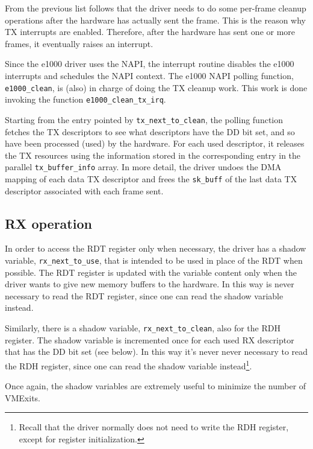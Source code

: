 From the previous list follows that the driver needs to do some per-frame cleanup operations after the hardware has actually sent the
frame. This is the reason why TX interrupts are enabled. Therefore, after the hardware has sent one or more frames, it eventually 
raises an interrupt.

\vspace{0.5cm}

Since the e1000 driver uses the NAPI, the interrupt routine disables the e1000 interrupts and schedules the NAPI context.
The e1000 NAPI polling function, \texttt{e1000\_clean}, is (also) in charge of doing the TX cleanup work. This work is done invoking
the function \texttt{e1000\_clean\_tx\_irq}.

Starting from the entry pointed by \texttt{tx\_next\_to\_clean}, the polling function fetches the TX descriptors to see what descriptors
have the DD bit set, and so have been processed (used) by the hardware. For each used descriptor, it releases the TX resources using the
information stored in the corresponding entry in the parallel \texttt{tx\_buffer\_info} array. In more detail, the driver undoes the DMA
mapping of each data TX descriptor and frees the \texttt{sk\_buff} of the last data TX descriptor associated with each frame sent.


\subsection{RX operation}
\label{sec:rxdriver}
In order to access the RDT register only when necessary, the driver has a shadow variable, \texttt{rx\_next\_to\_use}, that is intended to
be used in place of the RDT when possible. The RDT register is updated with the variable content only when the driver wants to give new
memory buffers to the hardware. In this way is never necessary to read the RDT register, since one can read the shadow variable instead.

Similarly, there is a shadow variable, \texttt{rx\_next\_to\_clean}, also for the RDH register. The shadow variable is incremented
once for each used RX descriptor that has the DD bit set (see below). In this way it's never never necessary
to read the RDH register, since one can read the shadow variable instead\footnote{Recall that the driver normally does not need to write
the RDH register, except for register initialization.}.

Once again, the shadow variables are extremely useful to minimize the number of VMExits.

